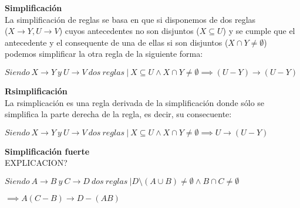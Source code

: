 

\textbf{Simplificaci\'on}\\
La simplificaci\'on de reglas se basa en que si disponemos de dos reglas \\ (\(X \to Y , U \to V\)) cuyos antecedentes no son disjuntos (\(X \subseteq U\)) y se cumple que el antecedente y el consequente de una de ellas si son disjuntos (\(X \cap Y \neq \emptyset\)) podemos simplificar la otra regla de la siguiente forma:

\begin{center}
    \(Siendo \ X \to Y \ y \ U\to V \ dos \ reglas \ | \ X \subseteq U \wedge X \cap Y \neq \emptyset \implies (U - Y) \to (U - Y)\)
\end{center}



\textbf{Rsimplificaci\'on}\\
La rsimplicaci\'on es una regla derivada de la simplificaci\'on donde s\'olo se simplifica la parte derecha de la regla, es decir, su consecuente:

\begin{center}
    \(Siendo \ X \to Y \ y \ U\to V \ dos \ reglas \ | \ X \subseteq U \wedge X \cap Y \neq \emptyset \implies U \to (U - Y)\)
\end{center}




% 
\newpage
\textbf{Simplificaci\'on fuerte}\\

EXPLICACION?

\begin{center}
    \(Siendo \ A \to B \ y \ C\to D \ dos \ reglas \ | D \setminus (A \cup B) \neq \emptyset \wedge B \cap C \neq \emptyset\)
\end{center}

\begin{center}
    \(\implies A(C-B) \to D - (AB)\)
\end{center}



